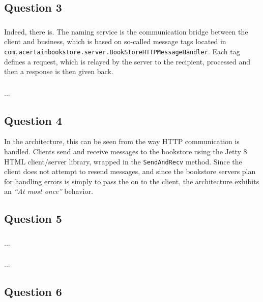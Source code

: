 \subsection{Question 3}

\subsubsection{}
Indeed, there is. The naming service is the communication bridge between the
client and business, which is based on so-called message tags located in \\
{\tt com.acertainbookstore.server.BookStoreHTTPMessageHandler}. Each tag defines
a request, which is relayed by the server to the recipient, processed and then
a response is then given back.

\subsubsection{}
...

\subsection{Question 4}
In the architecture, this can be seen from the way HTTP communication is handled. Clients send and receive messages to the bookstore using the Jetty 8 HTML client/server library, wrapped in the {\tt SendAndRecv} method. Since the client does not attempt to resend messages, and since the bookstore servers plan for handling errors is simply to pass the on to the client, the architecture exhibits an {\it ``At most once''} behavior.

\subsection{Question 5}

\subsubsection{}
...

\subsubsection{}
...

\subsection{Question 6}

